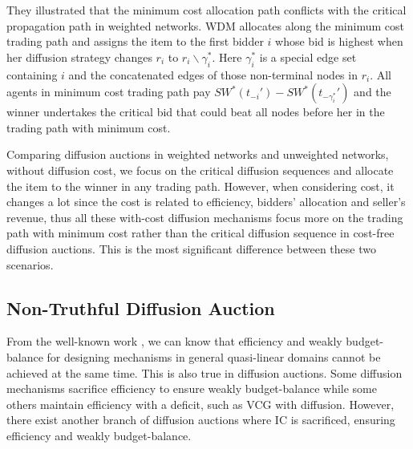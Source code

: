 \documentclass{article}
\begin{document}
They illustrated that the minimum cost allocation path conflicts with the critical propagation path in weighted networks. WDM allocates along the minimum cost trading path and assigns the item to the first bidder $i$ whose bid is highest when her diffusion strategy changes $r_i$ to $r_i\backslash \gamma^\ast_i$. Here $\gamma^\ast_i$ is a special edge set containing $i$ and the concatenated edges of those non-terminal nodes in $r_i$. All agents in minimum cost trading path pay $SW^\ast(t_{-i}')-SW^\ast(t_{-\gamma^\ast_i}')$ and the winner undertakes the critical bid that could beat all nodes before her in the trading path with minimum cost.

Comparing diffusion auctions in weighted networks and unweighted networks, without diffusion cost, we focus on the critical diffusion sequences and allocate the item to the winner in any trading path. However, when considering cost, it changes a lot since the cost is related to efficiency, bidders' allocation and seller's revenue, thus all these with-cost diffusion mechanisms focus more on the trading path with minimum cost rather than the critical diffusion sequence in cost-free diffusion auctions. This is the most significant difference between these two scenarios.

 \subsection{Non-Truthful Diffusion Auction}
 From the well-known work \cite{29088}, we can know that efficiency and weakly budget-balance for designing mechanisms in general quasi-linear domains cannot be achieved at the same time. This is also true in diffusion auctions. Some diffusion mechanisms sacrifice efficiency to ensure weakly budget-balance while some others maintain efficiency with a deficit, such as VCG
 with diffusion. However, there exist another branch of diffusion auctions where IC is sacrificed, ensuring efficiency and weakly budget-balance.
\end{document}
